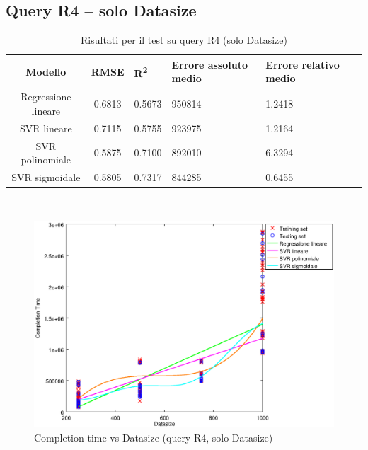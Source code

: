 \documentclass[a4paper,11pt]{article}
\begin{document}
\subsection{Query R4 -- solo Datasize}
\begin{table}[bhpt]
	\centering
	\begin{adjustbox}{center}
		\begin{tabular}{c | c M{1.2cm} M{2.5cm} M{2.5cm} M{1.8cm}}
			Modello & RMSE & R\textsuperscript{2} & Errore assoluto medio & Errore relativo medio \tabularnewline
			\hline
			Regressione lineare & 0.6813 & 0.5673 & 950814 & 1.2418 \\
			SVR lineare & 0.7115 & 0.5755 & 923975 & 1.2164 \\
			SVR polinomiale & 0.5875 & 0.7100 & 892010 & 6.3294 \\
			SVR sigmoidale & 0.5805 & 0.7317 & 844285 & 0.6455 \\
		\end{tabular}
	\end{adjustbox}
	\\
	\caption{Risultati per il test su query R4 (solo Datasize)}
	\label{table_R4_datasize}
\end{table}

\begin {figure}[hbtp]
\centering
\includegraphics[width=\textwidth]{output/R4_SOLO_DATASIZE/plot_R4.eps}
\caption {Completion time vs Datasize (query R4, solo Datasize)}
\end {figure}

\newpage
\end{document}
